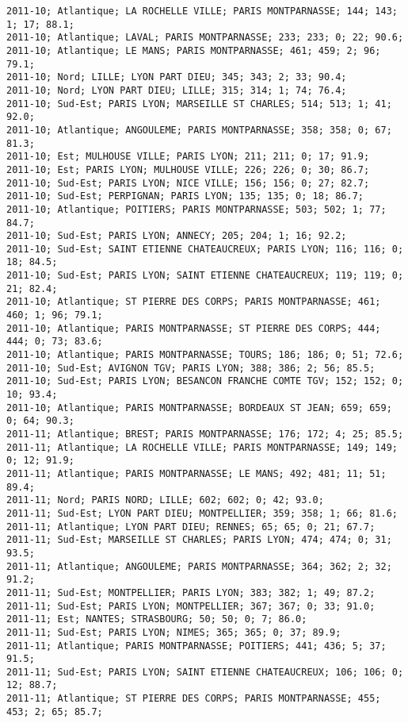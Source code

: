 \documentclass{article}
\begin{document}
\begin{Verbatim}[commandchars=\\\{\}]
2011-10; Atlantique; LA ROCHELLE VILLE; PARIS MONTPARNASSE; 144; 143; 1; 17; 88.1; 
2011-10; Atlantique; LAVAL; PARIS MONTPARNASSE; 233; 233; 0; 22; 90.6; 
2011-10; Atlantique; LE MANS; PARIS MONTPARNASSE; 461; 459; 2; 96; 79.1; 
2011-10; Nord; LILLE; LYON PART DIEU; 345; 343; 2; 33; 90.4; 
2011-10; Nord; LYON PART DIEU; LILLE; 315; 314; 1; 74; 76.4; 
2011-10; Sud-Est; PARIS LYON; MARSEILLE ST CHARLES; 514; 513; 1; 41; 92.0; 
2011-10; Atlantique; ANGOULEME; PARIS MONTPARNASSE; 358; 358; 0; 67; 81.3; 
2011-10; Est; MULHOUSE VILLE; PARIS LYON; 211; 211; 0; 17; 91.9; 
2011-10; Est; PARIS LYON; MULHOUSE VILLE; 226; 226; 0; 30; 86.7; 
2011-10; Sud-Est; PARIS LYON; NICE VILLE; 156; 156; 0; 27; 82.7; 
2011-10; Sud-Est; PERPIGNAN; PARIS LYON; 135; 135; 0; 18; 86.7; 
2011-10; Atlantique; POITIERS; PARIS MONTPARNASSE; 503; 502; 1; 77; 84.7; 
2011-10; Sud-Est; PARIS LYON; ANNECY; 205; 204; 1; 16; 92.2; 
2011-10; Sud-Est; SAINT ETIENNE CHATEAUCREUX; PARIS LYON; 116; 116; 0; 18; 84.5; 
2011-10; Sud-Est; PARIS LYON; SAINT ETIENNE CHATEAUCREUX; 119; 119; 0; 21; 82.4; 
2011-10; Atlantique; ST PIERRE DES CORPS; PARIS MONTPARNASSE; 461; 460; 1; 96; 79.1; 
2011-10; Atlantique; PARIS MONTPARNASSE; ST PIERRE DES CORPS; 444; 444; 0; 73; 83.6; 
2011-10; Atlantique; PARIS MONTPARNASSE; TOURS; 186; 186; 0; 51; 72.6; 
2011-10; Sud-Est; AVIGNON TGV; PARIS LYON; 388; 386; 2; 56; 85.5; 
2011-10; Sud-Est; PARIS LYON; BESANCON FRANCHE COMTE TGV; 152; 152; 0; 10; 93.4; 
2011-10; Atlantique; PARIS MONTPARNASSE; BORDEAUX ST JEAN; 659; 659; 0; 64; 90.3; 
2011-11; Atlantique; BREST; PARIS MONTPARNASSE; 176; 172; 4; 25; 85.5; 
2011-11; Atlantique; LA ROCHELLE VILLE; PARIS MONTPARNASSE; 149; 149; 0; 12; 91.9; 
2011-11; Atlantique; PARIS MONTPARNASSE; LE MANS; 492; 481; 11; 51; 89.4; 
2011-11; Nord; PARIS NORD; LILLE; 602; 602; 0; 42; 93.0; 
2011-11; Sud-Est; LYON PART DIEU; MONTPELLIER; 359; 358; 1; 66; 81.6; 
2011-11; Atlantique; LYON PART DIEU; RENNES; 65; 65; 0; 21; 67.7; 
2011-11; Sud-Est; MARSEILLE ST CHARLES; PARIS LYON; 474; 474; 0; 31; 93.5; 
2011-11; Atlantique; ANGOULEME; PARIS MONTPARNASSE; 364; 362; 2; 32; 91.2; 
2011-11; Sud-Est; MONTPELLIER; PARIS LYON; 383; 382; 1; 49; 87.2; 
2011-11; Sud-Est; PARIS LYON; MONTPELLIER; 367; 367; 0; 33; 91.0; 
2011-11; Est; NANTES; STRASBOURG; 50; 50; 0; 7; 86.0; 
2011-11; Sud-Est; PARIS LYON; NIMES; 365; 365; 0; 37; 89.9; 
2011-11; Atlantique; PARIS MONTPARNASSE; POITIERS; 441; 436; 5; 37; 91.5; 
2011-11; Sud-Est; PARIS LYON; SAINT ETIENNE CHATEAUCREUX; 106; 106; 0; 12; 88.7; 
2011-11; Atlantique; ST PIERRE DES CORPS; PARIS MONTPARNASSE; 455; 453; 2; 65; 85.7; 

\end{Verbatim}
\end{document}
